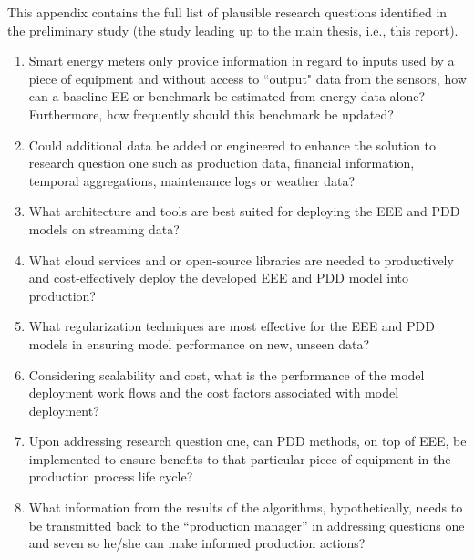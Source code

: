 This appendix contains the full list of plausible research questions identified in the preliminary study (the study leading up to the main thesis, i.e., this report).

\begin{enumerate}

    \item Smart energy meters only provide information in regard to inputs used by a piece of equipment and without access to ``output" data from the sensors, how can a baseline EE or benchmark be estimated from energy data alone? Furthermore, how frequently should this benchmark be updated?
    
    \item Could additional data be added or engineered to enhance the solution to research question one such as production data, financial information, temporal aggregations, maintenance logs or weather data?
    
    \item What architecture and tools are best suited for deploying the EEE and PDD models on streaming data?
    
    \item What cloud services and or open-source libraries are needed to productively and cost-effectively deploy the developed EEE and PDD model into production? 
    
    \item What regularization techniques are most effective for the EEE and PDD models in ensuring model performance on new, unseen data?
    
    \item Considering scalability and cost, what is the performance of the model deployment work flows and the cost factors associated with model deployment?
    
    \item Upon addressing research question one, can PDD methods, on top of EEE, be implemented to ensure benefits to that particular piece of equipment in the production process life cycle?
    
    \item What information from the results of the algorithms, hypothetically, needs to be transmitted back to the “production manager” in addressing questions one and seven so he/she can make informed production actions?
    
\end{enumerate}